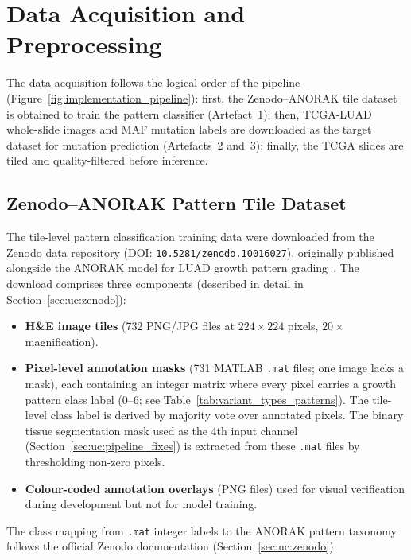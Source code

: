 \section{Data Acquisition and Preprocessing}
\label{sec:impl:data}

The data acquisition follows the logical order of the pipeline
(Figure~\ref{fig:implementation_pipeline}):
first, the Zenodo--ANORAK tile dataset is obtained to train the pattern
classifier (Artefact~1);
then, TCGA-LUAD whole-slide images and MAF mutation labels are downloaded
as the target dataset for mutation prediction (Artefacts~2 and~3);
finally, the TCGA slides are tiled and quality-filtered before inference.


\subsection{Zenodo--ANORAK Pattern Tile Dataset}
\label{sec:impl:data:zenodo}

The tile-level pattern classification training data were downloaded from
the Zenodo data repository (DOI: \texttt{10.5281/zenodo.10016027}),
originally published alongside the ANORAK model for LUAD growth pattern
grading~\cite{anorak2024}.
The download comprises three components
(described in detail in Section~\ref{sec:uc:zenodo}):
\begin{itemize}
    \item \textbf{H\&E image tiles} (732 PNG/JPG files at
    $224 \times 224$ pixels, $20\times$ magnification).
    \item \textbf{Pixel-level annotation masks} (731 MATLAB
    \texttt{.mat} files; one image lacks a mask), each containing an
    integer matrix where every pixel carries a growth pattern class
    label (0--6; see Table~\ref{tab:variant_types_patterns}).
    The tile-level class label is derived by majority vote over
    annotated pixels.
    The binary tissue segmentation mask used as the 4th input
    channel (Section~\ref{sec:uc:pipeline_fixes}) is extracted
    from these \texttt{.mat} files by thresholding non-zero pixels.
    \item \textbf{Colour-coded annotation overlays} (PNG files)
    used for visual verification during development but not for
    model training.
\end{itemize}

The class mapping from \texttt{.mat} integer labels to the
ANORAK pattern taxonomy follows the official Zenodo documentation
(Section~\ref{sec:uc:zenodo}).

